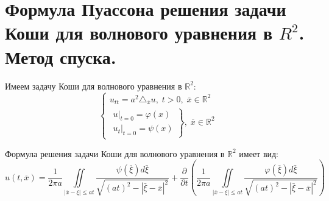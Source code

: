 \chapter{Формула Пуассона решения задачи Коши для волнового уравнения в $R^2$. Метод спуска.}
\label{cha:8}

Имеем задачу Коши для волнового уравнения в $\mathbb{R}^2$:
$$\begin{cases}
	u_{tt} = a^2 \triangle_{\overline{x}} u, \; t > 0, \; \overline{x} \in \mathbb{R}^2 \\
	\left.
  		\begin{array}{ccc}
    		u|_{t=0} = \varphi(x) \\
    		u_t |_{t=0} = \psi (x)
  		\end{array}
	\right\}, \; \overline{x} \in \mathbb{R}^2
\end{cases}$$
\begin{theorem}\label{lec:8/the:1}
	Формула решения задачи Коши для волнового уравнения в $\mathbb{R}^2$ имеет вид:
	$$u(t, \overline{x}) = \frac{1}{2 \pi a} \underset{|\overline{x} - \xi| \leq at}{\overset{}{\iint}} \dfrac{\psi (\overline{\xi}) d \bar{\xi} }{\sqrt{(at)^2 - |\bar{\xi} - \bar{x}|^2}} + \frac{\partial}{\partial t} (\frac{1}{2 \pi a} \underset{|\overline{x} - \xi| \leq at}{\overset{}{\iint}} \dfrac{\varphi (\overline{\xi}) d \bar{\xi} }{\sqrt{(at)^2 - |\bar{\xi} - \bar{x}|^2}}) $$
\end{theorem}

